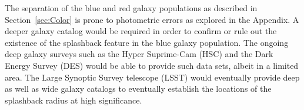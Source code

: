 \documentclass[iop, apjl, twocolappendix, numberedappendix]{emulateapj}
\begin{document}


The separation of the blue and red galaxy populations as described in
Section~\ref{sec:Color} is prone to photometric errors as explored in
the Appendix. A deeper galaxy catalog would be required in order to
confirm or rule out the existence of the splashback feature in the
blue galaxy population. The ongoing deep galaxy surveys such as the
Hyper Suprime-Cam (HSC) and the Dark Energy Survey (DES) would be able
to provide such data sets, albeit in a limited area. The Large
Synoptic Survey telescope (LSST) would eventually provide deep as well
as wide galaxy catalogs to eventually establish the locations of the
splashback radius at high significance.
\end{document}
